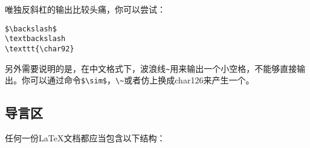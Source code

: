 唯独反斜杠的输出比较头痛，你可以尝试：
\begin{verbatim}
$\backslash$
\textbackslash
\texttt{\char92}
\end{verbatim}

另外需要说明的是，在中文格式下，波浪线{\texttt{\~}}用来输出一个小空格，不能够直接输出。你可以通过命令\verb+$\sim$+，\verb|\~|或者仿上换成char126来产生一个。

\subsection{导言区}
任何一份\LaTeX{}文档都应当包含以下结构：

